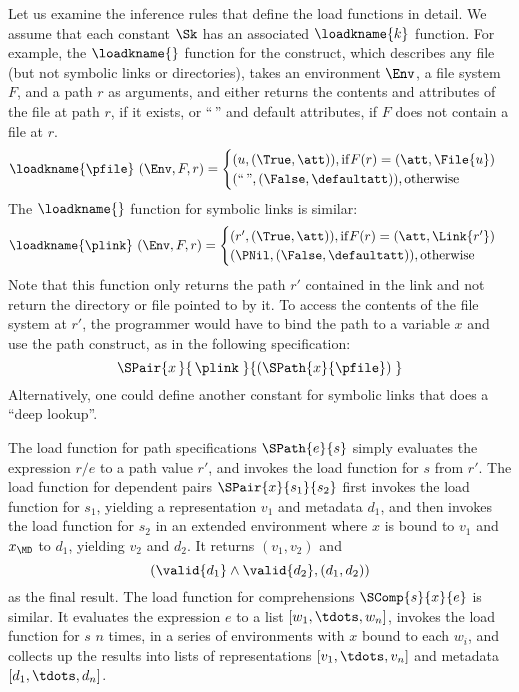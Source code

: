 Let us examine the inference rules that define the load functions in
detail. We assume that each constant $\Sk$ has an associated
$\loadkname{k}$ function. For example, the $\loadkname{}$ function for
the \pfile{} construct, which describes any file (but not symbolic
links or directories), takes an environment $\Env$, a file system $F$,
and a path $r$ as arguments, and either returns the contents and
attributes of the file at path $r$, if it exists, or ``$\,$'' and
default attributes, if $F$ does not contain a file at $r$.
%
\[
\loadkname{\pfile}~(\Env,F,r) =
\begin{cases}
  (u,(\True,\att)), \mathrm{if } F(r) = (\att,\File{u}) \\
  (\text{``}{\,}\text{''},(\False,\defaultatt)), \mathrm{otherwise}\\
\end{cases}
\]
%
The $\loadkname{}$ function for symbolic links is similar:
%
\[
\loadkname{\plink}~(\Env,F,r) =
\begin{cases}
  (r',(\True,\att)), \mathrm{if } F(r) = (\att,\Link{r'}) \\
  (\PNil,(\False,\defaultatt)), \mathrm{otherwise}\\
\end{cases}
\]
%
Note that this function only returns the path $r'$ contained in the
link and not return the directory or file pointed to by it. To access
the contents of the file system at $r'$, the programmer would have to
bind the path to a variable $x$ and use the path construct, as in the
following specification:
%
\[
\SPair{x\,}{\,\plink\;}{(\SPath{x}{\pfile})\;}
\]
%
Alternatively, one could define another constant for symbolic links
that does a ``deep lookup''.

The load function for path specifications $\SPath{e}{s}$ simply
evaluates the expression $r/e$ to a path value $r'$, and invokes the
load function for $s$ from $r'$. The load function for dependent pairs
$\SPair{x}{s_1}{s_2}$ first invokes the load function for $s_1$,
yielding a representation $v_1$ and metadata $d_1$, and then invokes
the load function for $s_2$ in an extended environment where $x$ is
bound to $v_1$ and $x_{\MD}$ to $d_1$, yielding $v_2$ and $d_2$. It
returns $(v_1,v_2)$ and
%
\[
(\valid{d_1} \wedge \valid{d_2},(d_1,d_2))
\]
as the final result. The load function for comprehensions
$\SComp{s}{x}{e}$ is similar. It evaluates the expression $e$ to a
list $[w_1,\tdots,w_n]$, invokes the load function for $s$ $n$ times,
in a series of environments with $x$ bound to each $w_i$, and collects
up the results into lists of representations $[v_1,\tdots,v_n]$ and
metadata $[d_1,\tdots,d_n]$.

